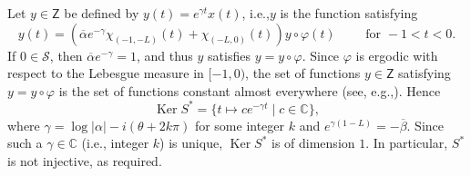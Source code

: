 \documentclass[10pt]{article}
\newcommand{\ie}{i.e.,\xspace}
\newcommand{\eg}{e.g.,\xspace}
\renewcommand{\eg}{e.g.,\xspace}
\theoremstyle{plain}
\theoremstyle{definition}
\DeclareMathOperator{\Ker}{Ker}
\newcommand{\abs}[1]{\left\lvert #1\right \rvert}
\numberwithin{equation}{section}\numberwithin{figure}{section}\emergencystretch=3em
\begin{document}
Let $y \in \mathsf Z$ be defined by $y(t) = e^{\gamma t} x(t)$, \ie $y$ is the function satisfying
\begin{equation}
\label{FixedPointV}
y(t) = \left(\overline\alpha e^{-\gamma} \chi_{(-1, -L)}(t) + \chi_{(-L, 0)}(t)\right) y \circ \varphi(t) \qquad \text{ for } -1 < t < 0.
\end{equation}
If $0 \in \mathcal S$, then $\overline\alpha e^{-\gamma} = 1$, and thus $y$ satisfies $y = y \circ \varphi$. Since $\varphi$ is ergodic with respect to the Lebesgue measure in $[-1, 0)$, the set of functions $y \in \mathsf Z$ satisfying $y = y \circ \varphi$ is the set of functions constant almost everywhere (see, \eg \cite[Chap.\,II, Prop.\,2.1]{Mane1987Ergodic}). Hence
\begin{equation}
\label{EqKerS}
\Ker S^\ast = \{t \mapsto c e^{-\gamma t} \mid c \in \mathbb C\},
\end{equation}
where $\gamma = \log\abs{\alpha} - i (\theta + 2 k \pi)$ for some integer $k$ and $e^{\gamma(1 - L)} = - \overline\beta$. Since such a $\gamma \in \mathbb C$ (\ie integer $k$) is unique, $\Ker S^\ast$ is of dimension $1$. In particular, $S^\ast$ is not injective, as required.
\end{document}
